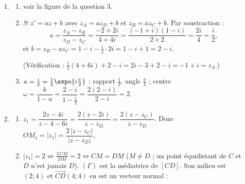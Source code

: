 \begin{enumerate}
      \emph{\'Equation probablement voulue} $z^2 - (1+i)z + 2 + 2i = 0$ : $\Delta = 2i - 8 - 8i = -8 - 6i = (1 - 3i)^2$,
      d'o\`u $z = \frac{1 + i \pm (1 - 3i)}{2}$ : 
   \item
      \begin{enumerate}
         \item {} voir la figure de la question 3.
         \item {}
            $S : z' = az + b$ avec $z_A = a z_D + b$ et $z_B = a z_C + b$. Par soustraction :
            \[
               a = \frac{z_A - z_B}{z_D - z_C} = \frac{-2 + 2i}{4 + 4i} = \frac{(-1 + i)(1 - i)}{2 \times 2} = \frac{2i}{4} = \frac{i}{2},
            \]
            et $b = z_B - a z_C = 1 - i - \frac{i}{2}\cdot 2i = 1 - i + 1 = 2 - i$.
            \par\noindent{}
            (V\'erification : $\frac{i}{2}(4 + 6i) + 2 - i = 2i - 3 + 2 - i = -1 + i = z_A$.)
         \item {}
            $a = \frac{i}{2} = \frac{1}{2}\expo{i\frac{\pi}{2}}$ : rapport $\frac{1}{2}$, angle $\frac{\pi}{2}$ ;
            centre $\omega = \dfrac{b}{1 - a} = \dfrac{2 - i}{1 - \frac{i}{2}} = \dfrac{2(2 - i)}{2 - i} = 2$.
            \par\noindent{}
      \end{enumerate}
   \item
      \begin{enumerate}
         \item {}
            $z_1 = \dfrac{2z - 4i}{z - 4 - 6i} = \dfrac{2(z - 2i)}{z - z_D} = \dfrac{2(z - z_C)}{z - z_D}$. Donc
            $OM_1 = |z_1| = \dfrac{2\,|z - z_C|}{|z - z_D|}$, 
         \item {}
            $|z_1| = 2 \iff \frac{2\,CM}{DM} = 2 \iff CM = DM$ ($M \neq D$ ; un point \'equidistant de $C$ et $D$ n'est jamais $D$).
            $(\Gamma)$ est la m\'ediatrice de $[CD]$. Son milieu est $(2 ; 4)$ et $\overrightarrow{CD}(4 ; 4)$ en est un vecteur normal :
            \par\noindent{}


\end{enumerate}
\end{enumerate}
